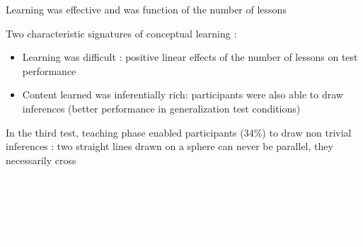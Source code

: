 \documentclass[11pt]{beamer}
\begin{document}
                    \begin{frame}

                      

                      
                      
                     Learning was effective and was function of the number of lessons 
                     



                     Two characteristic signatures of conceptual learning :

                     \begin{itemize}

                       \item{Learning was \textcolor{bittersweet}{difficult} :  positive linear effects of the number of lessons on test performance}


                   \item{   Content learned was \textcolor{bittersweet}{inferentially rich}: participants  were also able to draw inferences (better performance in generalization test conditions)}

                      \end{itemize}


                    \end{frame}

                    \begin{frame}
                      In the third test, teaching phase enabled participants (34\%) to draw non trivial inferences : \textcolor{bittersweet}{two straight lines drawn on a sphere can never be parallel, they necessarily cross}

                     \textcolor{white}{Counterintuitive for both Non/geometry-educated people \footnotesize{Izard et al. 2011}}

                      \normalsize

                      \textcolor{white}{ The experimental condition played a role in this understanding (linear trend of number of lessons for these two assertions, $\beta$ = 0.3, p = 0.001, controlling for years of education in mathematics)}


                    \end{frame}
\end{document}
